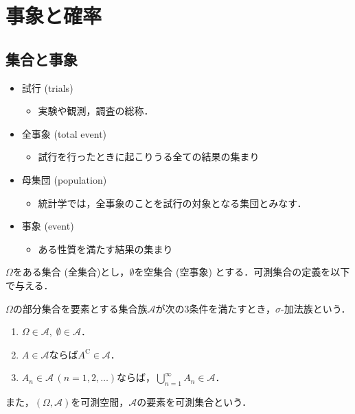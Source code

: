 \documentclass{jsreport}
\begin{document}
\chapter{事象と確率}
\section{集合と事象}
\begin{itemize}
  \item 試行 (trials)
  \begin{itemize}
    \item 実験や観測，調査の総称．
  \end{itemize}
  \item 全事象 (total event)
  \begin{itemize}
    \item 試行を行ったときに起こりうる全ての結果の集まり
  \end{itemize}
  \item 母集団 (population)
  \begin{itemize}
    \item 統計学では，全事象のことを試行の対象となる集団とみなす．
  \end{itemize}
  \item 事象 (event)
  \begin{itemize}
    \item ある性質を満たす結果の集まり
  \end{itemize}
\end{itemize}

$\Omega$をある集合 (全集合)とし，$\emptyset$を空集合 (空事象) とする．可測集合の定義を以下で与える．
\begin{screen}
  \begin{defi}
    $\Omega$の部分集合を要素とする集合族$\mathscr{A}$が次の3条件を満たすとき，$\sigma$-加法族という．
    \begin{enumerate}
      \item $\Omega \in \mathscr{A}, \; \emptyset \in \mathscr{A}$．
      \item $A \in \mathscr{A}$ならば$A^{\mathrm{C}} \in \mathscr{A}$．
      \item $A_n \in \mathscr{A} \, (n = 1, 2, \ldots)$ならば，$\bigcup_{n = 1}^{\infty} A_n \in \mathscr{A}$．
    \end{enumerate}
  \end{defi}
\end{screen}
また，$(\Omega, \mathscr{A})$を可測空間，$\mathscr{A}$の要素を可測集合という．
\end{document}
